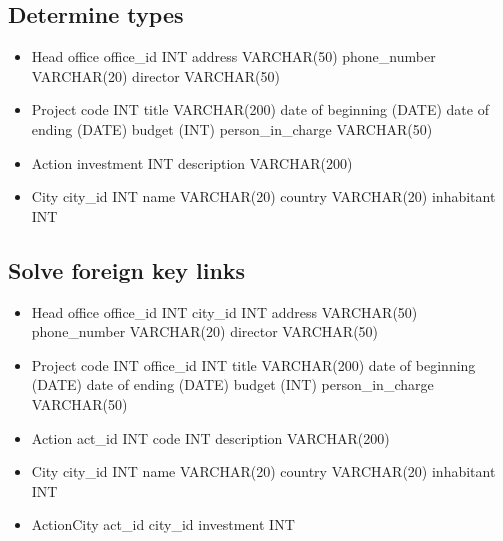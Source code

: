 \documentclass{article}
\begin{document}
\subsection{Determine types}
\begin{itemize}
    \item Head office 
    \subitem office\_id INT 
    \subitem address VARCHAR(50)
    \subitem phone\_number VARCHAR(20)
    \subitem director VARCHAR(50)
    
    \item Project
    \subitem code INT 
    \subitem title VARCHAR(200)
    \subitem date of beginning (DATE)
    \subitem date of ending  (DATE)
    \subitem budget (INT)
    \subitem person\_in\_charge VARCHAR(50)
    
    \item Action 
    \subitem investment INT 
    \subitem description VARCHAR(200)
    
    \item City
    \subitem city\_id INT 
    \subitem name VARCHAR(20)
    \subitem country VARCHAR(20)
    \subitem inhabitant INT
\end{itemize}

\subsection{Solve foreign key links}
\begin{itemize}
    \item Head office 
    \subitem office\_id INT 
    \subitem city\_id INT
    \subitem address VARCHAR(50)
    \subitem phone\_number VARCHAR(20)
    \subitem director VARCHAR(50)
    
    \item Project
    \subitem code INT 
    \subitem office\_id INT
    \subitem title VARCHAR(200)
    \subitem date of beginning (DATE)
    \subitem date of ending  (DATE)
    \subitem budget (INT)
    \subitem person\_in\_charge VARCHAR(50)
    
    \item Action 
    \subitem act\_id INT
    \subitem code INT
    \subitem description VARCHAR(200)
    
    \item City
    \subitem city\_id INT 
    \subitem name VARCHAR(20)
    \subitem country VARCHAR(20)
    \subitem inhabitant INT
    
    \item ActionCity 
    \subitem act\_id
    \subitem city\_id
    \subitem investment INT 
    
    
\end{itemize}
\end{document}
